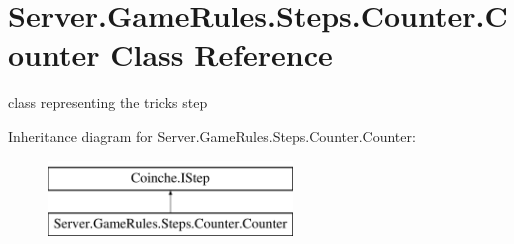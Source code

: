 \hypertarget{class_server_1_1_game_rules_1_1_steps_1_1_counter_1_1_counter}{}\section{Server.\+Game\+Rules.\+Steps.\+Counter.\+Counter Class Reference}
\label{class_server_1_1_game_rules_1_1_steps_1_1_counter_1_1_counter}


class representing the tricks step  


Inheritance diagram for Server.\+Game\+Rules.\+Steps.\+Counter.\+Counter\+:\begin{figure}[H]
\begin{center}
\leavevmode
\includegraphics[height=2.000000cm]{class_server_1_1_game_rules_1_1_steps_1_1_counter_1_1_counter}
\end{center}
\end{figure}

